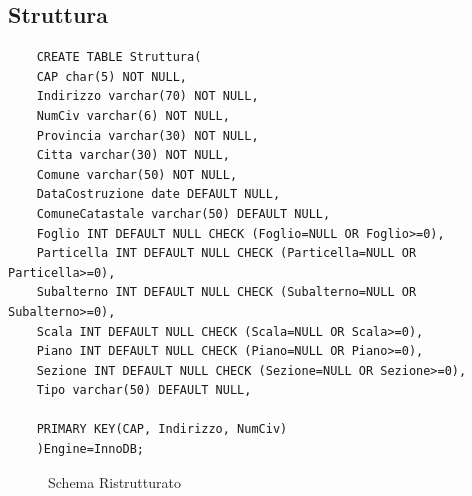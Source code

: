 \documentclass{elegantbook}
\begin{document}
\subsection{Struttura}
\begin{verbatim}
	CREATE TABLE Struttura(
	CAP char(5) NOT NULL,
	Indirizzo varchar(70) NOT NULL,
	NumCiv varchar(6) NOT NULL,
	Provincia varchar(30) NOT NULL,
	Citta varchar(30) NOT NULL,
	Comune varchar(50) NOT NULL,
	DataCostruzione date DEFAULT NULL,
	ComuneCatastale varchar(50) DEFAULT NULL,
	Foglio INT DEFAULT NULL CHECK (Foglio=NULL OR Foglio>=0),
	Particella INT DEFAULT NULL CHECK (Particella=NULL OR Particella>=0),
	Subalterno INT DEFAULT NULL CHECK (Subalterno=NULL OR Subalterno>=0),
	Scala INT DEFAULT NULL CHECK (Scala=NULL OR Scala>=0),
	Piano INT DEFAULT NULL CHECK (Piano=NULL OR Piano>=0),
	Sezione INT DEFAULT NULL CHECK (Sezione=NULL OR Sezione>=0),
	Tipo varchar(50) DEFAULT NULL,
	
	PRIMARY KEY(CAP, Indirizzo, NumCiv)
	)Engine=InnoDB;
\end{verbatim}
\begin{figure}[H]
	\centering
	\caption{Schema Ristrutturato}
\end{figure}
\end{document}
